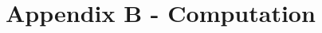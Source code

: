 \documentclass[12pt]{article}
\def\thetavec{\bm{\theta}}
\def\phivec{\bm{\phi}}
\def\aa{\bm{\alpha}_N}
\def\xx{\bm{x}}
\def\zz{\bm{z}}
\def\H{\bm{H}}
\def\O{\bm{\Omega}}
\def\zerovec{\bm{0}}
\def\csi{\bm{\xi}}
\begin{document}
%
%


\section*{Appendix B - Computation}
\end{document}
